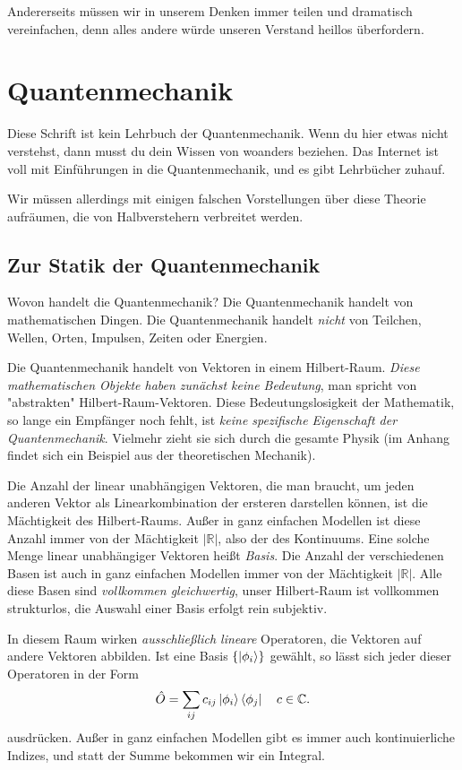 \documentclass[12pt]{book}
\begin{document}
Andererseits müssen wir in unserem Denken immer teilen und dramatisch vereinfachen, denn alles andere würde unseren Verstand heillos überfordern.

\section{Quantenmechanik}

Diese Schrift ist kein Lehrbuch der Quantenmechanik. Wenn du hier etwas nicht verstehst, dann musst du dein Wissen von woanders beziehen. Das Internet ist voll mit Einführungen in die Quantenmechanik, und es gibt Lehrbücher zuhauf. 

Wir müssen allerdings mit einigen falschen Vorstellungen über diese Theorie aufräumen, die von Halbverstehern verbreitet werden.

\subsection{Zur Statik der Quantenmechanik}

Wovon handelt die Quantenmechanik? Die Quantenmechanik handelt von mathematischen Dingen. Die Quantenmechanik handelt \emph{nicht} von Teilchen, Wellen, Orten, Impulsen, Zeiten oder Energien. 

Die Quantenmechanik handelt von Vektoren in einem Hilbert-Raum. \emph{Diese mathematischen Objekte haben zunächst keine Bedeutung}, man spricht von "abstrakten" Hilbert-Raum-Vektoren.
Diese Bedeutungslosigkeit der Mathematik, so lange ein Empfänger noch fehlt, ist \emph{keine spezifische Eigenschaft der Quantenmechanik}. Vielmehr zieht sie sich durch die gesamte Physik (im Anhang findet sich ein Beispiel aus der theoretischen Mechanik).

Die Anzahl der linear unabhängigen Vektoren, die man braucht, um jeden anderen Vektor als Linearkombination der ersteren darstellen können, ist die Mächtigkeit des Hilbert-Raums. Außer in ganz einfachen Modellen ist diese Anzahl immer von der Mächtigkeit $|\mathbb{R}|$, 
also der des Kontinuums. Eine solche Menge linear unabhängiger Vektoren heißt \emph{Basis}. Die Anzahl der verschiedenen Basen ist auch in ganz einfachen Modellen immer von der Mächtigkeit $|\mathbb{R}|$. Alle diese Basen sind \emph{vollkommen gleichwertig}, unser Hilbert-Raum ist vollkommen strukturlos, die Auswahl einer Basis erfolgt rein subjektiv.

In diesem Raum wirken \emph{ausschließlich lineare} Operatoren, die Vektoren auf andere Vektoren abbilden. Ist eine Basis $\{\ket{\phi_i}\}$ gewählt, so lässt sich jeder dieser Operatoren in der Form
\begin{equation*} 
\hat{O} = \sum_{ij} c_{ij} \ket{\phi_i}\bra{\phi_j} \quad c \in \mathbb{C}.
\end{equation*}
ausdrücken. Außer in ganz einfachen Modellen gibt es immer auch kontinuierliche Indizes, und statt der Summe bekommen wir ein Integral.
\end{document}
